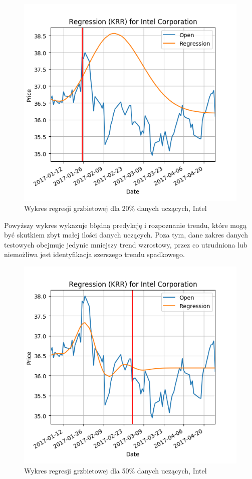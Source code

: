 \begin{figure}[ht]
\centering
\includegraphics[scale=0.4]{pictures/plots/intel_krr_20.png}
\caption{Wykres regresji grzbietowej dla 20\% danych uczących, Intel}
\label{fig:intel_krr_20}
\end{figure}

Powyższy wykres wykazuje błędną predykcję i rozpoznanie trendu, które mogą być skutkiem zbyt małej ilości danych uczących.
Poza tym, dane zakres danych testowych obejmuje jedynie mniejszy trend wzrostowy, przez co utrudniona lub niemożliwa jest identyfikacja szerszego trendu spadkowego.\\

\begin{figure}[ht]
\centering
\includegraphics[scale=0.4]{pictures/plots/intel_krr_50.png}
\caption{Wykres regresji grzbietowej dla 50\% danych uczących, Intel}
\label{fig:intel_krr_50}
\end{figure}

